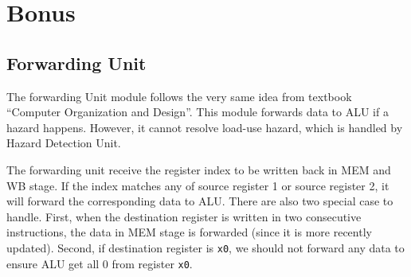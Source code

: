 \documentclass[a4paper,12pt]{article}
\begin{document}
\section{Bonus}

\subsection{Forwarding Unit}

The forwarding Unit module follows the very same idea from textbook ``Computer Organization and Design''. This module forwards data to ALU if a hazard happens. However, it cannot resolve load-use hazard, which is handled by Hazard Detection Unit.

The forwarding unit receive the register index to be written back in MEM and WB stage. If the index matches any of source register 1 or source register 2, it will forward the corresponding data to ALU. There are also two special case to handle. First, when the destination register is written in two consecutive instructions, the data in MEM stage is forwarded (since it is more recently updated). Second, if destination register is \texttt{x0}, we should not forward any data to ensure ALU get all 0 from register \texttt{x0}.
\end{document}
